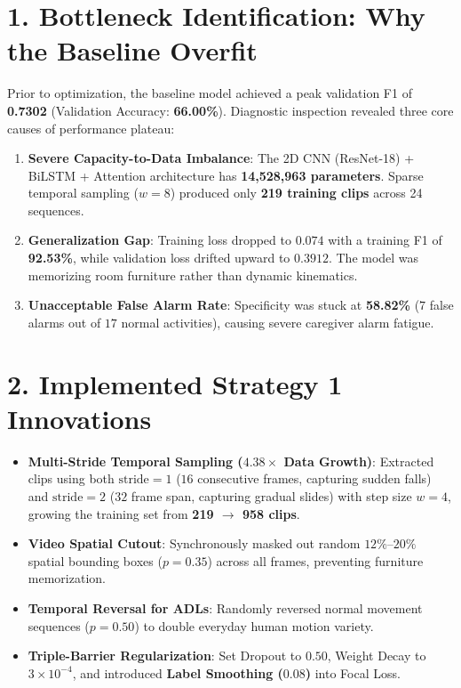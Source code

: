 \documentclass[11pt,a4paper]{article}
\begin{document}
\vspace{0.25cm}

\section{1. Bottleneck Identification: Why the Baseline Overfit}
Prior to optimization, the baseline model achieved a peak validation F1 of \textbf{0.7302} (Validation Accuracy: \textbf{66.00\%}). Diagnostic inspection revealed three core causes of performance plateau:
\begin{enumerate}
    \setlength\itemsep{0.15em}
    \item \textbf{Severe Capacity-to-Data Imbalance}: The 2D CNN (ResNet-18) + BiLSTM + Attention architecture has \textbf{14,528,963 parameters}. Sparse temporal sampling ($w=8$) produced only \textbf{219 training clips} across 24 sequences.
    \item \textbf{Generalization Gap}: Training loss dropped to $0.074$ with a training F1 of \textbf{92.53\%}, while validation loss drifted upward to $0.3912$. The model was memorizing room furniture rather than dynamic kinematics.
    \item \textbf{Unacceptable False Alarm Rate}: Specificity was stuck at \textbf{58.82\%} ($7$ false alarms out of $17$ normal activities), causing severe caregiver alarm fatigue.
\end{enumerate}

\vspace{0.15cm}

\section{2. Implemented Strategy 1 Innovations}
\begin{itemize}
    \setlength\itemsep{0.15em}
    \item \textbf{Multi-Stride Temporal Sampling ($4.38\times$ Data Growth)}: Extracted clips using both $\text{stride}=1$ ($16$ consecutive frames, capturing sudden falls) and $\text{stride}=2$ ($32$ frame span, capturing gradual slides) with step size $w=4$, growing the training set from \textbf{219 $\to$ 958 clips}.
    \item \textbf{Video Spatial Cutout}: Synchronously masked out random $12\%\text{--}20\%$ spatial bounding boxes ($p=0.35$) across all frames, preventing furniture memorization.
    \item \textbf{Temporal Reversal for ADLs}: Randomly reversed normal movement sequences ($p=0.50$) to double everyday human motion variety.
    \item \textbf{Triple-Barrier Regularization}: Set Dropout to $0.50$, Weight Decay to $3\times 10^{-4}$, and introduced \textbf{Label Smoothing ($0.08$)} into Focal Loss.
\end{itemize}
\end{document}
